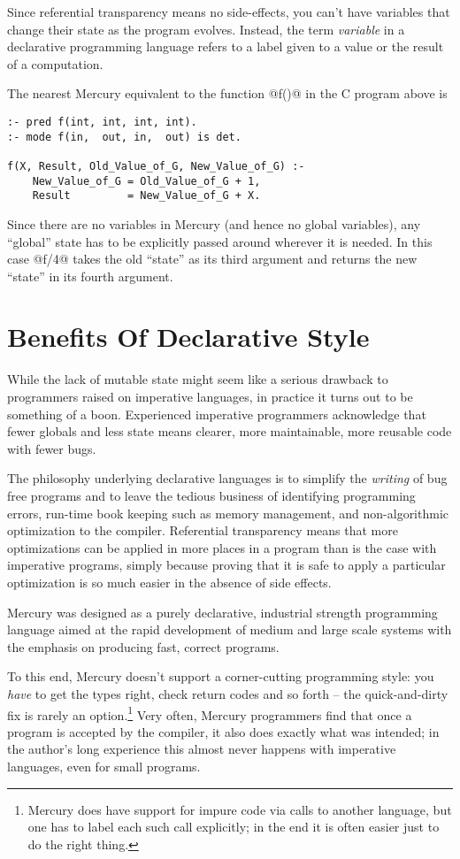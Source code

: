 Since referential transparency means no side-effects, you can't have
variables that change their state as the program evolves.  Instead, the
term \emph{variable} in a declarative programming language refers to a
label given to a value or the result of a computation.

The nearest Mercury equivalent to the function @f()@ in the C
program above is

\begin{verbatim}
:- pred f(int, int, int, int).
:- mode f(in,  out, in,  out) is det.

f(X, Result, Old_Value_of_G, New_Value_of_G) :-
    New_Value_of_G = Old_Value_of_G + 1,
    Result         = New_Value_of_G + X.
\end{verbatim}

Since there are no variables in Mercury (and hence no global
variables), any ``global'' state has to be explicitly passed
around wherever it is needed.  In this case @f/4@ takes the old
``state'' as its third argument and returns the new ``state'' in
its fourth argument.

\section{Benefits Of Declarative Style}

While the lack of mutable state might seem like a serious
drawback to programmers raised on imperative languages, in
practice it turns out to be something of a boon.  Experienced
imperative programmers acknowledge that fewer globals and less
state means clearer, more maintainable, more reusable code
with fewer bugs.

The philosophy underlying declarative languages is to simplify the
\emph{writing} of bug free programs and to leave the tedious
business of identifying programming errors, run-time book
keeping such as memory management, and non-algorithmic
optimization to the compiler.  Referential transparency means
that more optimizations can be applied in more places in a
program than is the case with imperative programs, simply
because proving that it is safe to apply a particular
optimization is so much easier in the absence of side effects.

Mercury was designed as a purely declarative, industrial
strength programming language aimed at the rapid development
of medium and large scale systems with the emphasis on
producing fast, correct programs.

To this end, Mercury doesn't support a corner-cutting
programming style: you \emph{have} to get the types right, check
return codes and so forth -- the quick-and-dirty fix is rarely
an option.\footnote{Mercury does have support for impure code
via calls to another language, but one has to label each such
call explicitly; in the end it is often easier just to do the
right thing.}  Very often, Mercury programmers find that once
a program is accepted by the compiler, it also does exactly
what was intended; in the author's long experience this almost
never happens with imperative languages, even for small
programs.


